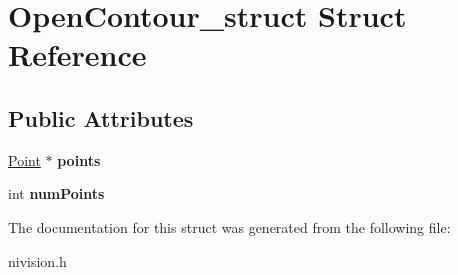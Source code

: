 \hypertarget{structOpenContour__struct}{\section{\-Open\-Contour\-\_\-struct \-Struct \-Reference}
\label{structOpenContour__struct}
}
\subsection*{\-Public \-Attributes}
\begin{DoxyCompactItemize}
\item 
\hypertarget{structOpenContour__struct_a2ad7b0c2f5e476352369e277c95e1e09}{\hyperlink{structPoint__struct}{\-Point} $\ast$ {\bfseries points}}\label{structOpenContour__struct_a2ad7b0c2f5e476352369e277c95e1e09}

\item 
\hypertarget{structOpenContour__struct_a6c85a5ebccc9cafc04b77216990b3d62}{int {\bfseries num\-Points}}\label{structOpenContour__struct_a6c85a5ebccc9cafc04b77216990b3d62}

\end{DoxyCompactItemize}


\-The documentation for this struct was generated from the following file\-:\begin{DoxyCompactItemize}
\item 
nivision.\-h\end{DoxyCompactItemize}
